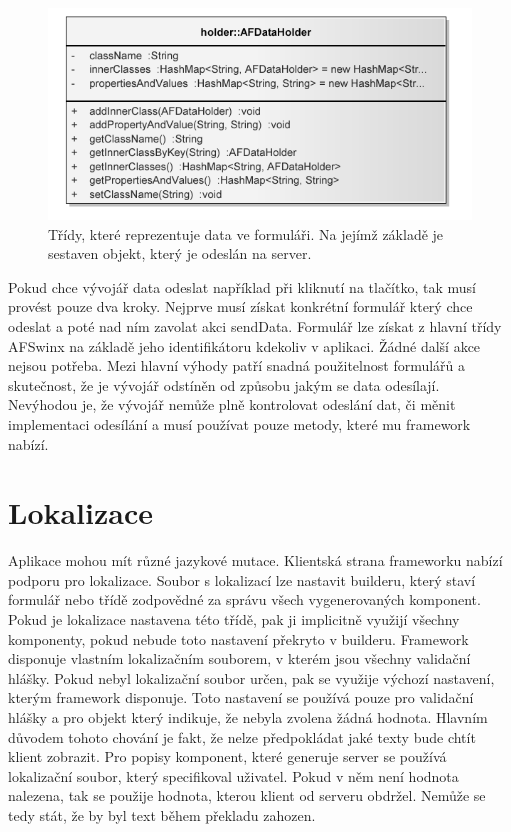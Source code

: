 \begin{figure}[h!]
\includegraphics{images/AFDataHolder}
\caption{Třídy, které reprezentuje data ve formuláři. Na jejímž základě je sestaven objekt, který je odeslán na server.}
\label{img:afDataHolder}
\end{figure}

Pokud chce vývojář data odeslat například při kliknutí na tlačítko, tak musí provést pouze dva kroky. Nejprve musí získat konkrétní formulář který chce odeslat a poté nad ním zavolat akci sendData. Formulář lze získat z hlavní třídy AFSwinx na základě jeho identifikátoru kdekoliv v aplikaci. Žádné další akce nejsou potřeba. Mezi hlavní výhody patří snadná použitelnost formulářů a skutečnost, že je vývojář odstíněn od způsobu jakým se data odesílají. Nevýhodou je, že vývojář nemůže plně kontrolovat odeslání dat, či měnit implementaci odesílání a musí používat pouze metody, které mu framework nabízí.
\section{Lokalizace}
Aplikace mohou mít různé jazykové mutace. Klientská strana frameworku nabízí podporu pro lokalizace. Soubor s lokalizací lze nastavit builderu, který staví formulář nebo třídě zodpovědné za správu všech vygenerovaných komponent. Pokud je lokalizace nastavena této třídě, pak ji implicitně využijí všechny komponenty, pokud nebude toto nastavení překryto v builderu. Framework disponuje vlastním lokalizačním souborem, v kterém jsou všechny validační hlášky. Pokud nebyl lokalizační soubor určen, pak se využije výchozí nastavení, kterým framework disponuje. Toto nastavení se používá pouze pro validační hlášky a pro objekt který indikuje, že nebyla zvolena žádná hodnota. Hlavním důvodem tohoto chování je fakt, že nelze předpokládat jaké texty bude chtít klient zobrazit. Pro popisy komponent, které generuje server se používá lokalizační soubor, který specifikoval uživatel. Pokud v něm není hodnota nalezena, tak se použije hodnota, kterou klient od serveru obdržel. Nemůže se tedy stát, že by byl text během překladu zahozen.
